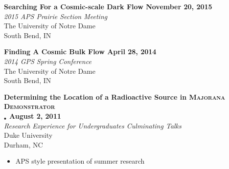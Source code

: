 \documentclass[margin]{res}
\begin{document}
\begin{resume}
{\bf Searching For a Cosmic-scale Dark Flow \hfill November 20, 2015} \\
{\sl 2015 APS Prairie Section Meeting} \\
The University of Notre Dame \\
South Bend, IN


{\bf Finding A Cosmic Bulk Flow \hfill April 28, 2014} \\
{\sl 2014 GPS Spring Conference} \\
The University of Notre Dame \\
South Bend, IN




{\bf Determining the Location of a Radioactive Source in \textsc{Majorana Demonstrator} \\
$_{•}    $  \hfill August 2, 2011} \\
{\sl Research Experience for Undergraduates Culminating Talks}  \\
Duke University \\
Durham, NC
\begin{itemize}\itemsep -2pt
     \item APS style presentation of summer research
\end{itemize}




\end{resume}
\end{document}
